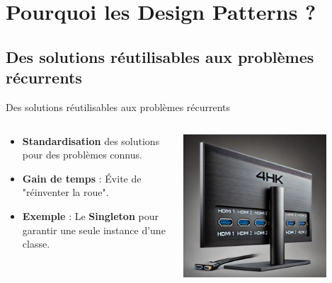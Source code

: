 \documentclass[aspectratio=169]{beamer}
\begin{document}

\section{Pourquoi les Design Patterns ?}

\subsection{Des solutions réutilisables aux problèmes récurrents}

\begin{frame}{Des solutions réutilisables aux problèmes récurrents}
    \begin{columns}
        \begin{column}{0.6\textwidth}
            \begin{itemize}
                \item \textbf{Standardisation} des solutions pour des problèmes connus.
                \item \textbf{Gain de temps} : Évite de "réinventer la roue".
                      \pause
                \item \textbf{Exemple} : Le \textbf{Singleton} pour garantir une seule instance d'une classe.
            \end{itemize}
        \end{column}
        \begin{column}{0.4\textwidth}
            \begin{center}
                \includegraphics[width=0.8\textwidth]{pic/singleton_pattern.png}
            \end{center}
        \end{column}
    \end{columns}
\end{frame}
\end{document}
